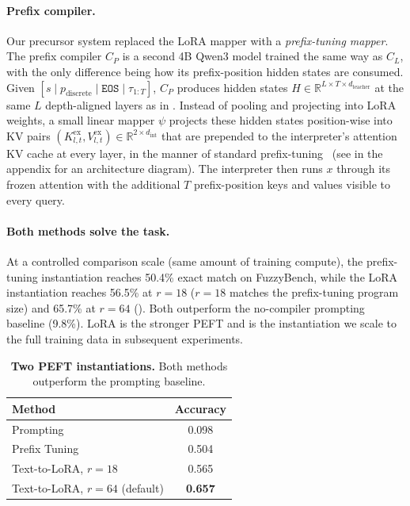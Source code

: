 \documentclass{article}
\theoremstyle{plain}
\theoremstyle{definition}
\theoremstyle{remark}
\begin{document}
\paragraph{Prefix compiler.}
Our precursor system replaced the LoRA mapper with a \emph{prefix-tuning mapper}. The prefix compiler $C_P$ is a second 4B Qwen3 model trained the same way as $C_L$, with the only difference being how its prefix-position hidden states are consumed. Given $[s \mid p_{\text{discrete}} \mid \texttt{EOS} \mid \tau_{1:T}]$, $C_P$ produces hidden states $H \in \mathbb{R}^{L \times T \times d_{\text{teacher}}}$ at the same $L$ depth-aligned layers as in . Instead of pooling and projecting into LoRA weights, a small linear mapper $\psi$ projects these hidden states position-wise into KV pairs $(K^{\text{ex}}_{l, t}, V^{\text{ex}}_{l, t}) \in \mathbb{R}^{2 \times d_{\text{int}}}$ that are prepended to the interpreter's attention KV cache at every layer, in the manner of standard prefix-tuning~\citep{li-liang-2021-prefix} (see  in the appendix for an architecture diagram). The interpreter then runs $x$ through its frozen attention with the additional $T$ prefix-position keys and values visible to every query.

\paragraph{Both methods solve the task.}
At a controlled comparison scale (same amount of training compute), the prefix-tuning instantiation reaches 50.4\% exact match on FuzzyBench, while the LoRA instantiation reaches 56.5\% at $r{=}18$ ($r{=}18$ matches the prefix-tuning program size) and 65.7\% at $r{=}64$ (). Both outperform the no-compiler prompting baseline (9.8\%). LoRA is the stronger PEFT and is the instantiation we scale to the full training data in subsequent experiments. %

\begin{table}[h]
\centering
\caption{\label{tab:peft_comparison}\textbf{Two PEFT instantiations.} Both methods outperform the prompting baseline.}
\begin{tabular}{@{}lc@{}}
\toprule
Method & Accuracy \\
\midrule
Prompting & 0.098 \\
Prefix Tuning        & 0.504 \\
Text-to-LoRA, $r{=}18$                      & 0.565 \\
{Text-to-LoRA, $r{=}64$ (default)}    & \textbf{0.657} \\
\bottomrule
\end{tabular}
\end{table}
\end{document}
